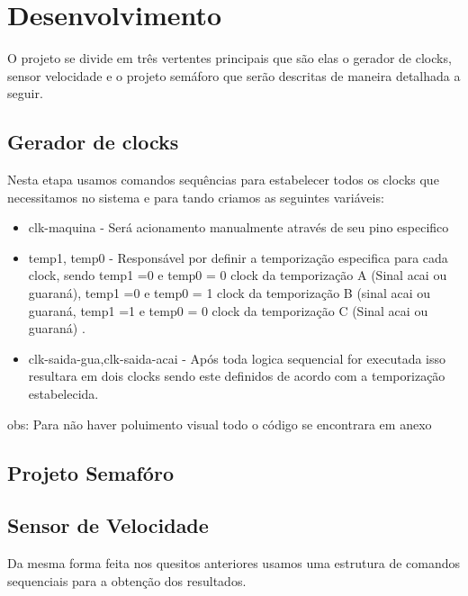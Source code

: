 
\section{Desenvolvimento}
\setlength{\parindent}{2cm}

O projeto se divide em três vertentes principais que são elas o gerador de clocks, sensor velocidade e o projeto semáforo que serão descritas de maneira detalhada a seguir.

\subsection{Gerador de clocks}
\setlength{\parindent}{2cm}

Nesta etapa usamos comandos sequências para estabelecer todos os clocks que necessitamos no sistema e para tando criamos as seguintes variáveis:

\begin{itemize}
\item clk-maquina - Será acionamento manualmente através de seu pino especifico 
\item temp1, temp0  - Responsável por definir a temporização especifica para cada clock, sendo temp1 =0 e temp0 = 0 clock da temporização A (Sinal acai ou  guaraná), temp1 =0 e temp0 = 1 clock da temporização B (sinal acai ou guaraná, temp1 =1 e temp0 = 0 clock da temporização C (Sinal acai ou guaraná) .
\item clk-saida-gua,clk-saida-acai - Após toda logica sequencial for executada isso resultara em dois clocks sendo este definidos de acordo com a temporização estabelecida.
\end{itemize}

\setlength{\parindent}{2cm}

obs: Para não haver poluimento visual todo o código se encontrara em anexo

\subsection{Projeto Semafóro}

\subsection{Sensor de Velocidade}

\setlength{\parindent}{2cm}

Da mesma forma feita nos quesitos anteriores usamos uma estrutura de comandos sequenciais para a obtenção dos resultados.
    
